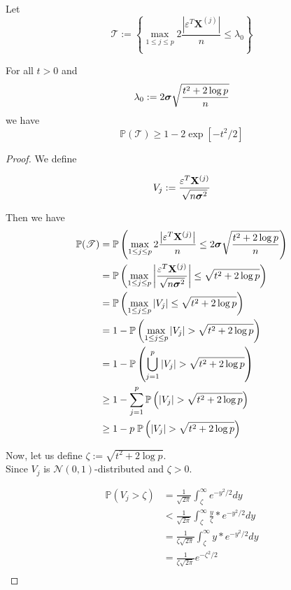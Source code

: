 Let
$$\mathscr{T} := \left\{\max _{1 \leq j \leq p} 2 \frac{\left| \varepsilon^{T} \mathbf{X}^{(j)}\right|}{n} \leq \lambda_{0}\right\}$$

\begin{lemma}[Lemma 6.2.]
    For all $t > 0$ and
    $$\lambda_{0}:=2 \boldsymbol{\sigma} \sqrt{\frac{t^{2}+2 \log p}{n}}$$
    we have
    $$\mathbb{P}(\mathscr{T}) \geq 1-2 \exp \left[-t^{2} / 2\right]$$
\end{lemma}
\begin{proof}
    We define

    $$
        V_{j} := \frac{\varepsilon^{T} \mathbf{X}^{(j)}}{\sqrt{n \boldsymbol{\sigma}^{2}}}
    $$

    Then we have
    \begin{align}
        \nonumber
        \mathbb{P}(\mathscr{T})
         & = \mathbb{P} \left( \max _{1 \leq j \leq p} 2 \frac{\left| \varepsilon^{T} \mathbf{X}^{(j)}\right|}{n} \leq 2 \boldsymbol{\sigma} \sqrt{\frac{t^{2}+2 \log p}{n}}  \right) \\
        \nonumber
         & =
        \mathbb{P} \left( \max _{1 \leq j \leq p} \left| \frac{\varepsilon^{T} \mathbf{X}^{(j)}}{\sqrt{n \boldsymbol{\sigma}^{2}}} \right| \leq \sqrt{t^{2}+2 \log p}  \right)        \\
        \nonumber
         & =
        \mathbb{P} \left( \max _{1 \leq j \leq p} | V_{j} | \leq \sqrt{t^{2}+2 \log p}  \right)                                                                        \\
        \nonumber
         & = 1 - \mathbb{P} \left( \max _{1 \leq j \leq p} | V_{j} | > \sqrt{t^{2}+2 \log p}  \right)                                                                  \\
        \nonumber
         & = 1 - \mathbb{P} \left( \bigcup_{j = 1}^{p} | V_{j} | > \sqrt{t^{2}+2 \log p}  \right)                                                                      \\
        \nonumber
         & \geq 1 - \sum_{j = 1}^{p} \mathbb{P} \left( | V_{j} | > \sqrt{t^{2}+2 \log p}  \right)                                                                      \\
        \label{eqn: proof lemma 6.2.}
         & \geq 1 - p \; \mathbb{P} \left( | V_{j} | > \sqrt{t^{2}+2 \log p}  \right)
    \end{align}

    Now, let us define $\zeta := \sqrt{t^{2}+2 \log p}$. \\
    Since $V_j$ is $\mathscr{N} (0,1)$-distributed and $\zeta > 0$.

    \begin{align*}
        \mathbb{P}(V_j > \zeta) & = \frac{1}{\sqrt{2\pi}} \int_\zeta^{\infty} e^{-y^2/2} dy                     \\
                                & < \frac{1}{\sqrt{2\pi}} \int_\zeta^{\infty} \frac{y}{\zeta} * e^{-y^2 / 2} dy \\
                                & = \frac{1}{\zeta \sqrt{2\pi}} \int_\zeta^{\infty} y * e^{-y^2 / 2} dy         \\
                                & = \frac{1}{\zeta\sqrt{2\pi}} e^{-\zeta^2/2}                                   \\
    \end{align*}


\end{proof}
